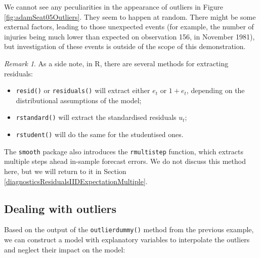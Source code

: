 \documentclass[
]{book}
\providecommand{\tightlist}{%
  \setlength{\itemsep}{0pt}\setlength{\parskip}{0pt}}
\theoremstyle{definition}
\theoremstyle{definition}
\theoremstyle{definition}
\theoremstyle{definition}
\theoremstyle{remark}
\newtheorem*{remark}{Remark}
\begin{document}
We cannot see any peculiarities in the appearance of outliers in Figure \ref{fig:adamSeat05Outliers}. They seem to happen at random. There might be some external factors, leading to those unexpected events (for example, the number of injuries being much lower than expected on observation 156, in November 1981), but investigation of these events is outside of the scope of this demonstration.

\begin{remark}
As a side note, in R, there are several methods for extracting residuals:

\begin{itemize}
\tightlist
\item
  \texttt{resid()} or \texttt{residuals()} will extract either \(e_t\) or \(1+e_t\), depending on the distributional assumptions of the model;
\item
  \texttt{rstandard()} will extract the standardised residuals \(u_t\);
\item
  \texttt{rstudent()} will do the same for the studentised ones.
\end{itemize}

The \texttt{smooth} package also introduces the \texttt{rmultistep} function, which extracts multiple steps ahead in-sample forecast errors. We do not discuss this method here, but we will return to it in Section \ref{diagnosticsResidualsIIDExpectationMultiple}.
\end{remark}

\hypertarget{dealing-with-outliers}{%
\subsection{Dealing with outliers}\label{dealing-with-outliers}}

Based on the output of the \texttt{outlierdummy()} method from the previous example, we can construct a model with explanatory variables to interpolate the outliers and neglect their impact on the model:
\end{document}

